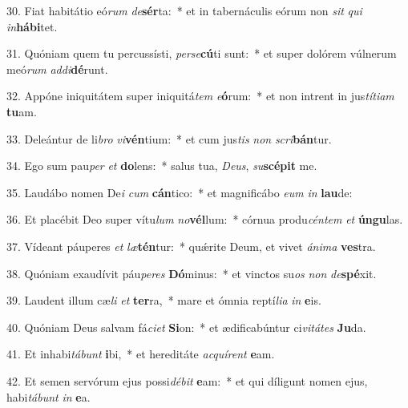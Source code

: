 30. Fiat habitátio eó\textit{rum} \textit{de}\textbf{sér}ta:~*  et in tabernáculis eórum non \textit{sit} \textit{qui} \textit{in}\textbf{há}\textbf{bi}tet.\

31. Quóniam quem tu percussísti, \textit{per}\textit{se}\textbf{cú}ti sunt:~*  et super dolórem vúlnerum meó\textit{rum} \textit{ad}\textit{di}\textbf{dé}runt.\

32. Appóne iniquitátem super iniquitá\textit{tem} \textit{e}\textbf{ó}rum:~*  et non intrent in jus\textit{tí}\textit{ti}\textit{am} \textbf{tu}am.\

33. Deleántur de li\textit{bro} \textit{vi}\textbf{vén}tium:~*  et cum jus\textit{tis} \textit{non} \textit{scri}\textbf{bán}tur.\

34. Ego sum pau\textit{per} \textit{et} \textbf{do}lens:~*  salus tua, \textit{De}\textit{us}, \textit{su}\textbf{scé}\textbf{pit} me.\

35. Laudábo nomen De\textit{i} \textit{cum} \textbf{cán}tico:~*  et magnificábo \textit{e}\textit{um} \textit{in} \textbf{lau}de:\

36. Et placébit Deo super vítu\textit{lum} \textit{no}\textbf{vél}lum:~*  córnua produ\textit{cén}\textit{tem} \textit{et} \textbf{ún}\textbf{gu}las.\

37. Vídeant páuperes \textit{et} \textit{læ}\textbf{tén}tur:~*  quǽrite Deum, et vivet \textit{á}\textit{ni}\textit{ma} \textbf{ves}tra.\

38. Quóniam exaudívit páu\textit{pe}\textit{res} \textbf{Dó}minus:~*  et vinctos su\textit{os} \textit{non} \textit{de}\textbf{spé}xit.\

39. Laudent illum cæ\textit{li} \textit{et} \textbf{ter}ra,~*  mare et ómnia reptí\textit{li}\textit{a} \textit{in} \textbf{e}is.\

40. Quóniam Deus salvam fá\textit{ci}\textit{et} \textbf{Si}on:~*  et ædificabúntur ci\textit{vi}\textit{tá}\textit{tes} \textbf{Ju}da.\

41. Et inhabi\textit{tá}\textit{bunt} \textbf{i}bi,~*  et hereditáte \textit{ac}\textit{quí}\textit{rent} \textbf{e}am.\

42. Et semen servórum ejus possi\textit{dé}\textit{bit} \textbf{e}am:~*  et qui díligunt nomen ejus, habi\textit{tá}\textit{bunt} \textit{in} \textbf{e}a.\

